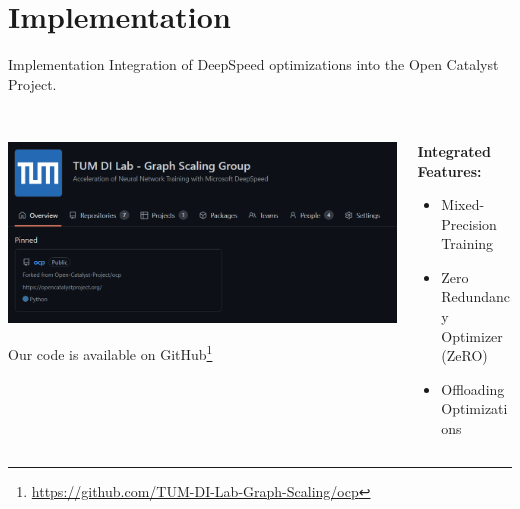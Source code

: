 \section{Implementation}

\begin{frame}{Implementation}
    Integration of DeepSpeed optimizations into the Open Catalyst Project. \\~\\ 

    \begin{columns}
        \begin{column}{0.5\textwidth}
            \begin{center}
                \includegraphics[scale=0.22]{figures/ocp-branch.png}
    
                Our code is available on GitHub\footnote{\url{https://github.com/TUM-DI-Lab-Graph-Scaling/ocp}}
            \end{center}  
        \end{column} 

        \begin{column}{0.5\textwidth}
            \textbf{Integrated Features:}

            \begin{itemize}
                \item \textcolor{green}{} Mixed-Precision Training
                \item \textcolor{green}{} Zero Redundancy Optimizer (ZeRO)
                \item \textcolor{green}{} Offloading Optimizations
            \end{itemize}
        \end{column} 
    \end{columns}
\end{frame}

